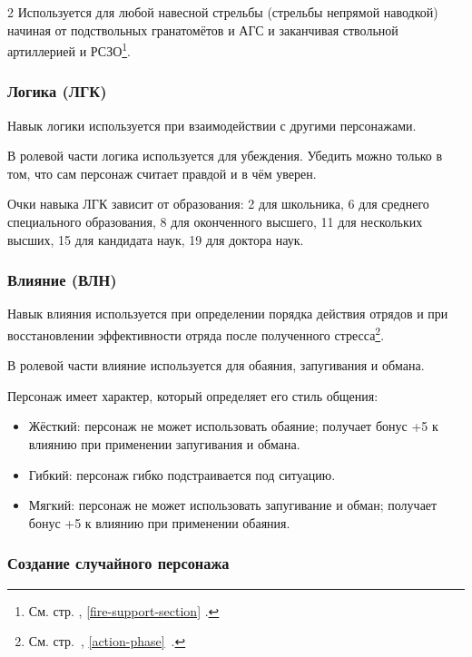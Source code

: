\documentclass[twoside]{article}
\begin{document}
\begin{multicols}{2}
Используется для любой навесной стрельбы (стрельбы непрямой наводкой)
начиная от подствольных гранатомётов и АГС и заканчивая ствольной
артиллерией и РСЗО\footnote{См. стр. \pageref{fire-support-section}, \ref{fire-support-section} .}.

\subsubsection{Логика (ЛГК)}\label{logic}

Навык логики используется при взаимодействии с другими персонажами.

В ролевой части логика используется для убеждения. Убедить можно только
в том, что сам персонаж считает правдой и в чём уверен.

Очки навыка ЛГК зависит от образования: 2 для школьника, 6 для среднего
специального образования, 8 для оконченного высшего, 11 для нескольких
высших, 15 для кандидата наук, 19 для доктора наук.

\subsubsection{Влияние (ВЛН)}\label{influence}

Навык влияния используется при определении порядка действия отрядов и
при восстановлении эффективности отряда после полученного
стресса\footnote{См. стр.~\pageref{action-phase}, \ref{action-phase}~.}.

В ролевой части влияние используется для обаяния, запугивания и обмана.

Персонаж имеет характер, который определяет его стиль общения:

\begin{itemize}
\item
  Жёсткий: персонаж не может использовать обаяние; получает бонус +5 к
  влиянию при применении запугивания и обмана.
\item
  Гибкий: персонаж гибко подстраивается под ситуацию.
\item
  Мягкий: персонаж не может использовать запугивание и обман; получает
  бонус +5 к влиянию при применении обаяния.
\end{itemize}

\subsubsection{Создание случайного персонажа}\label{char-gen}


\end{multicols}
\end{document}
